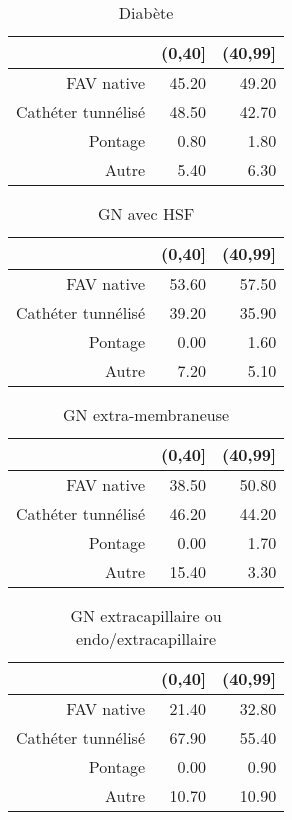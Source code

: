 \documentclass[11pt,a4paper]{article}\usepackage[]{graphicx}\usepackage[]{color}
\begin{document}
\begin{table}[H]
\centering
\begin{tabular}{rrr}
  \hline
 & (0,40] & (40,99] \\ 
  \hline
FAV native & 45.20 & 49.20 \\ 
  Cathéter tunnélisé & 48.50 & 42.70 \\ 
  Pontage & 0.80 & 1.80 \\ 
  Autre & 5.40 & 6.30 \\ 
   \hline
\end{tabular}
\caption{Diabète} 
\end{table}
\begin{table}[H]
\centering
\begin{tabular}{rrr}
  \hline
 & (0,40] & (40,99] \\ 
  \hline
FAV native & 53.60 & 57.50 \\ 
  Cathéter tunnélisé & 39.20 & 35.90 \\ 
  Pontage & 0.00 & 1.60 \\ 
  Autre & 7.20 & 5.10 \\ 
   \hline
\end{tabular}
\caption{GN avec HSF} 
\end{table}
\begin{table}[H]
\centering
\begin{tabular}{rrr}
  \hline
 & (0,40] & (40,99] \\ 
  \hline
FAV native & 38.50 & 50.80 \\ 
  Cathéter tunnélisé & 46.20 & 44.20 \\ 
  Pontage & 0.00 & 1.70 \\ 
  Autre & 15.40 & 3.30 \\ 
   \hline
\end{tabular}
\caption{GN extra-membraneuse} 
\end{table}
\begin{table}[H]
\centering
\begin{tabular}{rrr}
  \hline
 & (0,40] & (40,99] \\ 
  \hline
FAV native & 21.40 & 32.80 \\ 
  Cathéter tunnélisé & 67.90 & 55.40 \\ 
  Pontage & 0.00 & 0.90 \\ 
  Autre & 10.70 & 10.90 \\ 
   \hline
\end{tabular}
\caption{GN extracapillaire ou endo/extracapillaire} 
\end{table}
\end{document}
